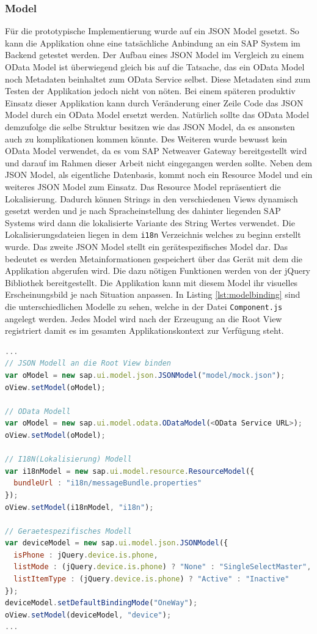 \subsubsection{Model}
Für die prototypische Implementierung wurde auf ein JSON Model gesetzt. So kann die Applikation ohne eine tatsächliche Anbindung an ein SAP System im Backend getestet werden. Der Aufbau eines JSON Model im Vergleich zu einem OData Model ist überwiegend gleich bis auf die Tatsache, das ein OData Model noch Metadaten beinhaltet zum OData Service selbst. Diese Metadaten sind zum Testen der Applikation jedoch nicht von nöten. Bei einem späteren produktiv Einsatz dieser Applikation kann durch Veränderung einer Zeile Code das JSON Model durch ein OData Model ersetzt werden. Natürlich sollte das OData Model demzufolge die selbe Struktur besitzen wie das JSON Model, da es ansonsten auch zu komplikationen kommen könnte. Des Weiteren wurde bewusst kein OData Model verwendet, da es vom SAP Netweaver Gateway bereitgestellt wird und darauf im Rahmen dieser Arbeit nicht eingegangen werden sollte. Neben dem JSON Model, als eigentliche Datenbasis, kommt noch ein Resource Model und ein weiteres JSON Model zum Einsatz. Das Resource Model repräsentiert die Lokalisierung. Dadurch können Strings in den verschiedenen Views dynamisch gesetzt werden und je nach Spracheinstellung des dahinter liegenden SAP Systems wird dann die lokalisierte Variante des String Wertes verwendet. Die Lokalisierungsdateien liegen in dem \texttt{i18n} Verzeichnis welches zu beginn erstellt wurde. Das zweite JSON Model stellt ein gerätespezifisches Model dar. Das bedeutet es werden Metainformationen gespeichert über das Gerät mit dem die Applikation abgerufen wird. Die dazu nötigen Funktionen werden von der jQuery Bibliothek bereitgestellt. Die Applikation kann mit diesem Model ihr visuelles Erscheinungsbild je nach Situation anpassen. In Listing \ref{lst:modelbinding} sind die unterschiedlichen Modelle zu sehen, welche in der Datei \texttt{Component.js} angelegt werden. Jedes Model wird nach der Erzeugung an die Root View registriert damit es im gesamten Applikationskontext zur Verfügung steht.

\vspace{1em}
\begin{lstlisting}[language=JavaScript, caption=Model an die Root View binden, label=lst:modelbinding]
...
// JSON Modell an die Root View binden
var oModel = new sap.ui.model.json.JSONModel("model/mock.json");
oView.setModel(oModel);

// OData Modell
var oModel = new sap.ui.model.odata.ODataModel(<OData Service URL>);
oView.setModel(oModel);

// I18N(Lokalisierung) Modell
var i18nModel = new sap.ui.model.resource.ResourceModel({
  bundleUrl : "i18n/messageBundle.properties"
});
oView.setModel(i18nModel, "i18n");

// Geraetespezifisches Modell
var deviceModel = new sap.ui.model.json.JSONModel({
  isPhone : jQuery.device.is.phone,
  listMode : (jQuery.device.is.phone) ? "None" : "SingleSelectMaster",
  listItemType : (jQuery.device.is.phone) ? "Active" : "Inactive"
});
deviceModel.setDefaultBindingMode("OneWay");
oView.setModel(deviceModel, "device");
...
\end{lstlisting}

